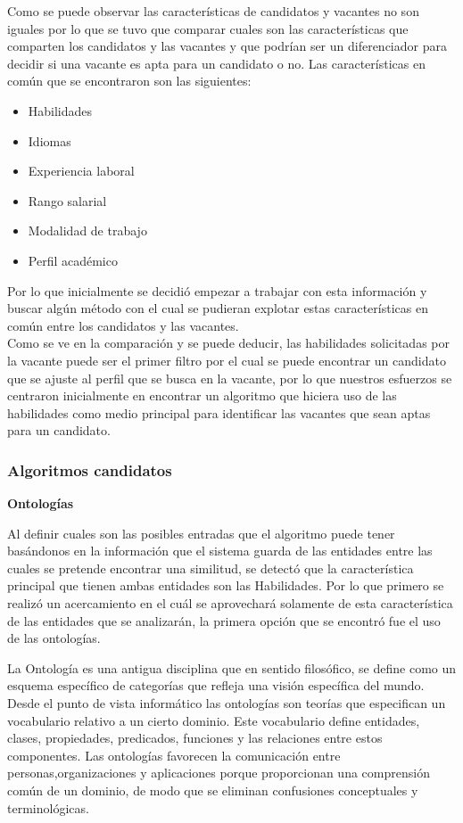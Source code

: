 Como se puede observar las características de candidatos y vacantes no son iguales por lo que se tuvo que comparar cuales son las características que comparten los candidatos y las vacantes y que podrían ser un diferenciador para decidir si una vacante es apta para un candidato o no. Las características en común que se encontraron son las siguientes:
\begin{itemize}
    \item Habilidades
    \item Idiomas
    \item Experiencia laboral
    \item Rango salarial
    \item Modalidad de trabajo
    \item Perfil académico
\end{itemize} 
Por lo que inicialmente se decidió empezar a  trabajar con esta información y buscar algún método con el cual se pudieran explotar estas características en común entre los candidatos y las vacantes.\\
\newline
Como se  ve en la comparación y se puede deducir, las habilidades solicitadas por la vacante puede ser el primer filtro por el cual se puede encontrar un candidato que se ajuste al perfil que se busca en la vacante, por lo que nuestros esfuerzos se centraron inicialmente en encontrar un algoritmo que hiciera uso de las habilidades como medio principal para identificar las vacantes que sean aptas para un candidato.

\subsubsection{Algoritmos candidatos}
\textbf{Ontologías}\\
\newline

Al definir cuales son las posibles entradas que el algoritmo puede tener basándonos en la información que el sistema guarda de las entidades entre las cuales se pretende encontrar una similitud, se detectó que la característica principal que tienen ambas entidades son las Habilidades. Por lo que primero se realizó un acercamiento en el cuál se aprovechará solamente de esta característica de las entidades que se analizarán, la primera opción que se encontró fue el uso de las ontologías. \\
\newline

La Ontología es una antigua disciplina que en sentido filosófico, se define como un esquema específico de categorías que refleja una visión específica del mundo. Desde el punto de vista informático las ontologías  son  teorías  que  especifican  un  vocabulario  relativo  a un  cierto  dominio.  Este  vocabulario  define  entidades,  clases, propiedades,  predicados,  funciones  y  las  relaciones  entre estos componentes. Las   ontologías   favorecen   la   comunicación   entre   personas,organizaciones    y    aplicaciones    porque    proporcionan    una comprensión  común  de  un  dominio,  de  modo  que  se  eliminan confusiones   conceptuales   y   terminológicas. \\
\newline

